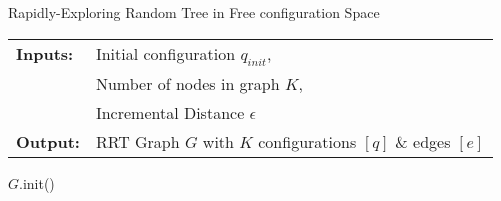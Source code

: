 \bigskip
\begin{algorithm}[H]
    \caption{Rapidly-Exploring Random Tree in Free \Gls{configuration} Space}
    \SetAlgoLined
    \begin{tabular}{l l}
    \textbf{Inputs:}    & Initial \gls{configuration} $q_{init}$,\\ 
                        & Number of nodes in graph $K$, \\
                        & Incremental Distance $\epsilon$ \\
    \textbf{Output:}    & RRT Graph $G$ with $K$ \gls{configuration}s $[q]$ \& edges $[e]$ \\
    \end{tabular}

        $G$.init()
\label{algorithm:rrt}
\end{algorithm}
\bigskip